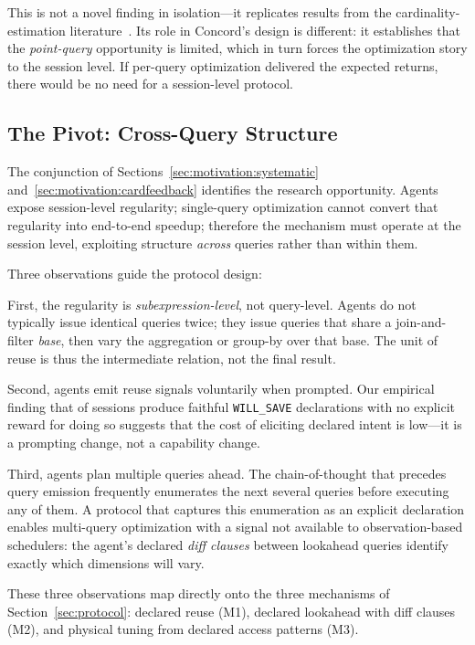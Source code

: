 This is not a novel finding in isolation---it replicates results from the cardinality-estimation literature~\cite{han2022cardeval}. Its role in Concord's design is different: it establishes that the \emph{point-query} opportunity is limited, which in turn forces the optimization story to the session level. If per-query optimization delivered the expected returns, there would be no need for a session-level protocol.

\subsection{The Pivot: Cross-Query Structure}
\label{sec:motivation:pivot}

The conjunction of Sections~\ref{sec:motivation:systematic} and~\ref{sec:motivation:cardfeedback} identifies the research opportunity. Agents expose session-level regularity; single-query optimization cannot convert that regularity into end-to-end speedup; therefore the mechanism must operate at the session level, exploiting structure \emph{across} queries rather than within them.

Three observations guide the protocol design:

First, the regularity is \emph{subexpression-level}, not query-level. Agents do not typically issue identical queries twice; they issue queries that share a join-and-filter \emph{base}, then vary the aggregation or group-by over that base. The unit of reuse is thus the intermediate relation, not the final result.

Second, agents emit reuse signals voluntarily when prompted. Our empirical finding that \adoptionRate of sessions produce faithful \texttt{WILL\_SAVE} declarations with no explicit reward for doing so suggests that the cost of eliciting declared intent is low---it is a prompting change, not a capability change.

Third, agents plan multiple queries ahead. The chain-of-thought that precedes query emission frequently enumerates the next several queries before executing any of them. A protocol that captures this enumeration as an explicit declaration enables multi-query optimization with a signal not available to observation-based schedulers: the agent's declared \emph{diff clauses} between lookahead queries identify exactly which dimensions will vary.

These three observations map directly onto the three mechanisms of Section~\ref{sec:protocol}: declared reuse (M1), declared lookahead with diff clauses (M2), and physical tuning from declared access patterns (M3).
